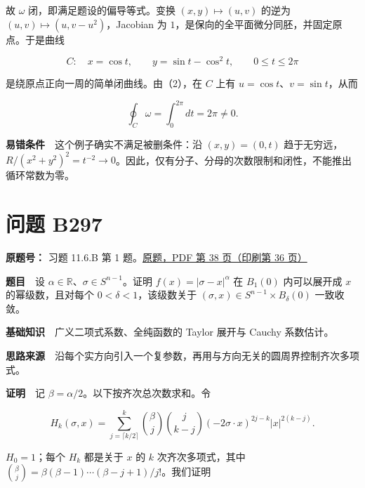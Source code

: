 \documentclass[11pt,a4paper]{article}
\begin{document}
故 \(\omega\) 闭，即满足题设的偏导等式。变换 \((x,y)\mapsto(u,v)\)
的逆为 \((u,v)\mapsto(u,v-u^2)\)，Jacobian 为
\(1\)，是保向的全平面微分同胚，并固定原点。于是曲线

\begin{equation}
C:\quad x=\cos t,\qquad y=\sin t-\cos^2t,
\qquad 0\le t\le2\pi
\tag{4}
\end{equation}

是绕原点正向一周的简单闭曲线。由（2），在 \(C\) 上有
\(u=\cos t\)、\(v=\sin t\)，从而

\begin{equation}
\oint_C\omega=\int_0^{2\pi}dt=2\pi\ne0.
\tag{5}
\end{equation}

\textbf{易错条件}　这个例子确实不满足被删条件：沿 \((x,y)=(0,t)\)
趋于无穷远，\(R/(x^2+y^2)^2=t^{-2}\to0\)。因此，仅有分子、分母的次数限制和闭性，不能推出循环常数为零。

\section{问题 B297}\label{ux95eeux9898-b297}

\textbf{原题号：} 习题 11.6.B 第 1
题。\href{https://zj139.github.io/math-notes/files/problems/楼分析习题-v2.pdf\#page=38}{原题，PDF
第 38 页（印刷第 36 页）}

\textbf{题目}　设 \(\alpha\in\mathbb R\)、\(\sigma\in S^{n-1}\)。证明
\(f(x)=|\sigma-x|^\alpha\) 在 \(B_1(0)\) 内可以展开成 \(x\)
的幂级数，且对每个 \(0<\delta<1\)，该级数关于
\((\sigma,x)\in S^{n-1}\times B_\delta(0)\) 一致收敛。

\textbf{基础知识}　广义二项式系数、全纯函数的 Taylor 展开与 Cauchy
系数估计。

\textbf{思路来源}　沿每个实方向引入一个复参数，再用与方向无关的圆周界控制齐次多项式。

\textbf{证明}　记 \(\beta=\alpha/2\)。以下按齐次总次数求和。令

\begin{equation}
H_k(\sigma,x)=
\sum_{j=\lceil k/2\rceil}^{k}
\binom{\beta}{j}\binom{j}{k-j}
(-2\sigma\cdot x)^{2j-k}|x|^{2(k-j)}.
\tag{6}
\end{equation}

\(H_0=1\)；每个 \(H_k\) 都是关于 \(x\) 的 \(k\) 次齐次多项式，其中
\(\binom\beta j=\beta(\beta-1)\cdots(\beta-j+1)/j!\)。我们证明
\end{document}

